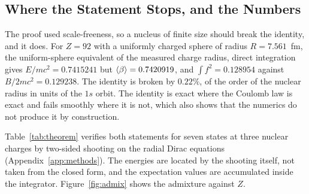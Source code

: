 \documentclass[%
 reprint, amsmath,amssymb, aps, prb, ]{revtex4-2}
\numberwithin{equation}{section}
\begin{document}
\subsection{Where the Statement Stops, and the Numbers}
\label{subsec:theorem_boundary}

The proof used scale-freeness, so a nucleus of finite size should break the identity, and it does. For $Z = 92$ with a uniformly charged sphere of radius $R = 7.561$~fm, the uniform-sphere equivalent of the measured charge radius, direct integration gives $E/mc^{2} = 0.7415241$ but $\expval{\beta} = 0.7420919$, and $\int f^{2} = 0.128954$ against $B/2mc^{2} = 0.129238$. The identity is broken by $0.22\%$, of the order of the nuclear radius in units of the $1s$ orbit. The identity is exact where the Coulomb law is exact and fails smoothly where it is not, which also shows that the numerics do not produce it by construction.

Table~\ref{tab:theorem} verifies both statements for seven states at three nuclear charges by two-sided shooting on the radial Dirac equations (Appendix~\ref{app:methods}). The energies are located by the shooting itself, not taken from the closed form, and the expectation values are accumulated inside the integrator. Figure~\ref{fig:admix} shows the admixture against $Z$.
\end{document}
